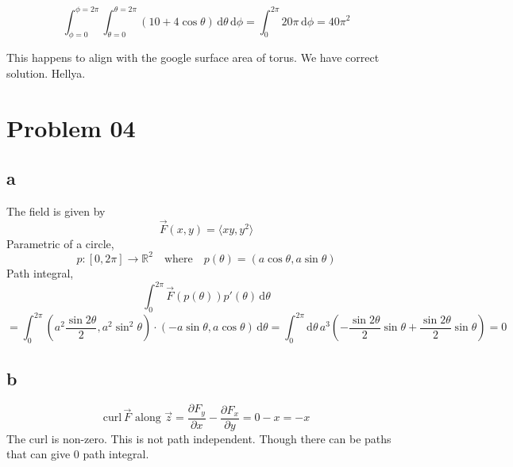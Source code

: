 \documentclass[letter]{article}
\begin{document}
\[
\int_{\phi = 0}^{\phi = 2\pi }  \int_{\theta = 0}^{\theta = 2 \pi }  
(10 + 4 \cos \theta)
\, \mathrm{d} \theta \, \mathrm{d} \phi = 
\int_{0}^{2\pi } 20 \pi \, \mathrm{d} \phi = \boxed{
40 \pi^2
} 
\] 

This happens to align with the google surface area of torus. We have correct solution. Hellya. 









\newpage
\section*{Problem 04} 
\subsection*{a}
The field is given by
\[
\vec{F} (x,y) = \langle  xy, y^2 \rangle
\]
Parametric of a circle, 
\[
	p : [0, 2 \pi ] \to \mathbb{R}^{2} \quad \text{where} \quad p(\theta) = (a \cos \theta, a \sin \theta)
\] 
Path integral, 
\[\int_{0}^{2 \pi } \vec{F}(p(\theta) ) p'(\theta) \, \mathrm{d} \theta \]
\[
= \int_{0}^{2 \pi }  \left(
a^2 \frac{\sin 2 \theta}{2}, a^2 \sin ^2\theta
 \right) \cdot  
 \left(- a \sin \theta, a \cos \theta\right) \, \mathrm{d} \theta =
 \int_{0 }^{2 \pi } \mathrm{d} \theta \, a ^3 \left(
-\frac{\sin 2 \theta}{2} \sin \theta + \frac{\sin 2 \theta}{2} \sin \theta
 \right) = \boxed{
 0
 } 
\] 


\subsection*{b} 
\[
\text{curl} \, \vec{F} \text{ along $\vec{z}$} = \frac{\partial F_y}{\partial x} - \frac{\partial F_x}{\partial y} = 0 - x = \boxed{
-x
}
\]
The curl is non-zero. This is not path independent. Though there can be paths that can give $0$ path integral.  
\end{document}
